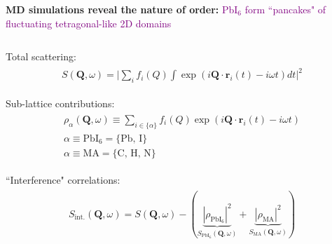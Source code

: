 \documentclass[12pt]{beamer}
\begin{document}
{\begin{frame}
\begin{columns}
\begin{column}{0.5\textwidth}
\textbf{MD simulations reveal the nature of order:} \textcolor{purple}{PbI$_6$ form ``pancakes" of fluctuating tetragonal-like 2D domains}

\end{column}
\end{columns}

\end{frame}

}


\begin{frame} %

Total scattering:
\begin{align*}
\begin{gathered}
    S(\bm{Q},\omega) = \Big| \sum_i f_i(Q) \int \exp(i\bm{Q}\cdot \bm{r}_i(t) -i \omega t ) dt \Big|^2
\end{gathered}
\end{align*}

Sub-lattice contributions:
\begin{align*}
\begin{gathered}
    \rho_\alpha(\bm{Q},\omega) \equiv \sum_{i \in \{ \alpha \} } f_i(Q) \exp(i\bm{Q}\cdot \bm{r}_i(t) - i\omega t) \\
    \alpha \equiv \textrm{PbI}_6 = \{ \textrm{Pb,~I} \} \\
    \alpha \equiv \textrm{MA} = \{ \textrm{C,~H,~N} \}
\end{gathered}
\end{align*}

``Interference" correlations:
\begin{align*}
\begin{gathered}
        S_\text{int.}(\bm{Q},\omega) = S(\bm{Q},\omega)-(\underbrace{|\rho_{\text{PbI}_6}|^2}_{S_{\text{PbI}_6}(\bm{Q},\omega)}+\underbrace{|\rho_\text{MA}|^2}_{S_\text{MA}(\bm{Q},\omega)})
\end{gathered}
\end{align*}

\end{frame}

\end{document}
